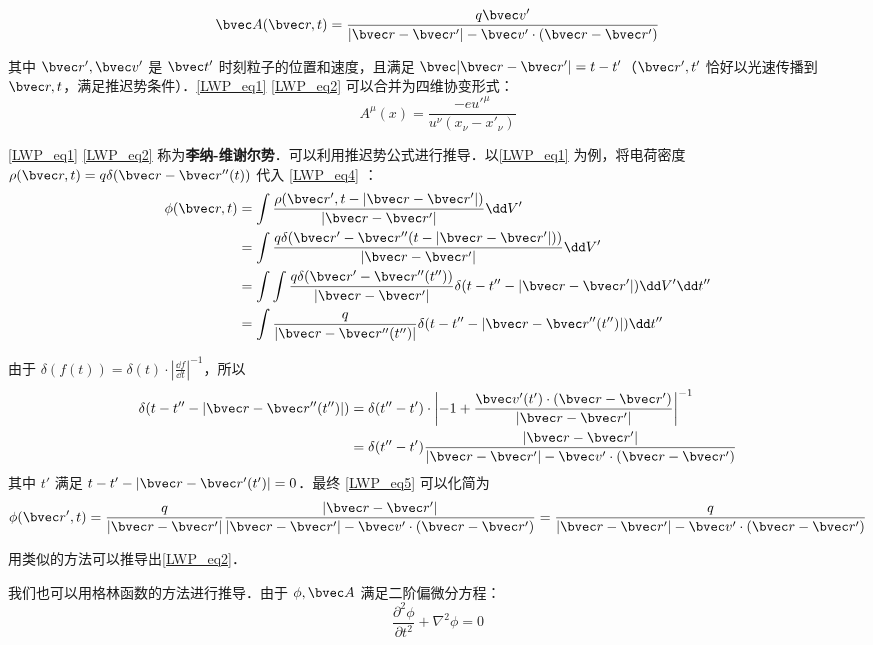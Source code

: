 \begin{equation}\label{LWP_eq2}
\bvec A(\bvec r,t)=\frac{q\bvec v'}{|\bvec r-\bvec r'|-\bvec v'\cdot (\bvec r-\bvec r')}
\end{equation}

其中 $\bvec r',\bvec v'$ 是 $\bvec t'$ 时刻粒子的位置和速度，且满足 $\bvec |\bvec r-\bvec r'|=t-t'$（$\bvec r',t'$ 恰好以光速传播到 $\bvec r,t$，满足推迟势条件）．\autoref{LWP_eq1} \autoref{LWP_eq2} 可以合并为四维协变形式：
\begin{equation}
A^\mu(x)=\frac{-e u'^\mu}{u^\nu (x_\nu-x'_\nu)}
\end{equation}

\autoref{LWP_eq1} \autoref{LWP_eq2} 称为\textbf{李纳-维谢尔势}．可以利用推迟势公式进行推导．以\autoref{LWP_eq1} 为例，将电荷密度 $\rho(\bvec r,t)=q\delta(\bvec r-\bvec r''(t))$ 代入 
\autoref{LWP_eq4} ：
\begin{equation}\label{LWP_eq5}
\begin{aligned}
\phi(\bvec r,t)&=\int \frac{\rho(\bvec r',t-|\bvec r-\bvec r'|)}{|\bvec r-\bvec r'|}\dd V'\\
&=\int \frac{q\delta(\bvec r'-\bvec r''(t-|\bvec r-\bvec r'|))}{|\bvec r-\bvec r'|}\dd V'\\
&=\int \int \frac{q\delta(\bvec r'-\bvec r''(t''))}{|\bvec r-\bvec r'|}\delta (t-t''-|\bvec r-\bvec r'|)\dd V'\dd t''\\
&=\int \frac{q}{|\bvec r-\bvec r''(t'')|}\delta (t-t''-|\bvec r-\bvec r''(t'')|)\dd t''
\end{aligned}\\
\end{equation}

由于 $\delta(f(t))=\delta(t)\cdot \left|\frac{\dd f}{\dd t}\right|^{-1}$，所以
\begin{equation}
\begin{aligned}
\delta (t-t''-|\bvec r-\bvec r''(t'')|)&=\delta(t''-t')\cdot \left|-1+\frac{\bvec v'(t')\cdot (\bvec r-\bvec r')}{|\bvec r-\bvec r'|}\right|^{-1}\\
&=\delta(t''-t')\frac{|\bvec r-\bvec r'|}{|\bvec r-\bvec r'|-\bvec v'\cdot (\bvec r-\bvec r')}
\end{aligned}
\end{equation}
其中 $t'$ 满足 $t-t'-|\bvec r-\bvec r'(t')|=0$．最终 \autoref{LWP_eq5} 可以化简为
\begin{equation}
\phi(\bvec r',t)=\frac{q}{|\bvec r-\bvec r'|}\frac{|\bvec r-\bvec r'|}{|\bvec r-\bvec r'|-\bvec v'\cdot (\bvec r-\bvec r')}=\frac{q}{|\bvec r-\bvec r'|-\bvec v'\cdot (\bvec r-\bvec r')}
\end{equation}

用类似的方法可以推导出\autoref{LWP_eq2}．

我们也可以用格林函数的方法进行推导．由于 $\phi,\bvec A$ 满足二阶偏微分方程：
\begin{equation}
\frac{\partial^2 \phi}{\partial t^2}+\nabla^2 \phi= 0
\end{equation}